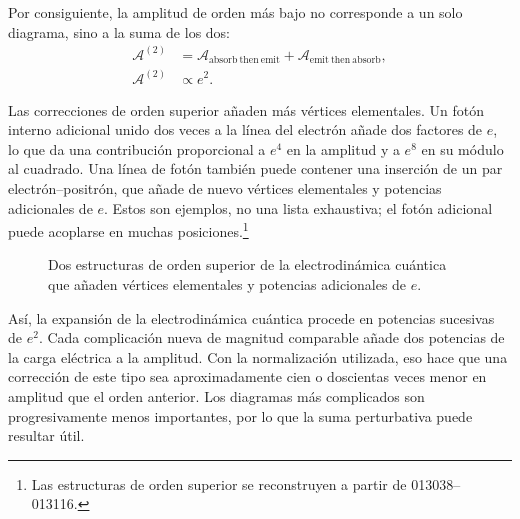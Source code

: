 Por consiguiente, la amplitud de orden más bajo no corresponde a un solo diagrama, sino a la suma de los dos:
\begin{equation}
\begin{aligned}
\mathcal{A}^{(2)}
&=
\mathcal{A}_{\mathrm{absorb\ then\ emit}}
+\mathcal{A}_{\mathrm{emit\ then\ absorb}},\\
\mathcal{A}^{(2)}&\propto e^2.
\end{aligned}
\end{equation}

Las correcciones de orden superior añaden más vértices elementales. Un fotón interno adicional unido dos veces a la línea del electrón añade dos factores de \(e\), lo que da una contribución proporcional a \(e^4\) en la amplitud y a \(e^8\) en su módulo al cuadrado. Una línea de fotón también puede contener una inserción de un par electrón--positrón, que añade de nuevo vértices elementales y potencias adicionales de \(e\). Estos son ejemplos, no una lista exhaustiva; el fotón adicional puede acoplarse en muchas posiciones.\footnote{Las estructuras de orden superior se reconstruyen a partir de 013038--013116.}

\begin{figure}[htbp]\centering
{}\caption{Dos estructuras de orden superior de la electrodinámica cuántica que añaden vértices elementales y potencias adicionales de \(e\).}\end{figure}

Así, la expansión de la electrodinámica cuántica procede en potencias sucesivas de \(e^2\). Cada complicación nueva de magnitud comparable añade dos potencias de la carga eléctrica a la amplitud. Con la normalización utilizada, eso hace que una corrección de este tipo sea aproximadamente cien o doscientas veces menor en amplitud que el orden anterior. Los diagramas más complicados son progresivamente menos importantes, por lo que la suma perturbativa puede resultar útil.

